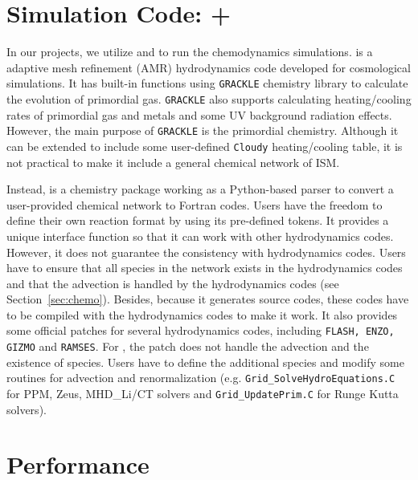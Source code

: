 \section{Simulation Code: \ENZO+\KROME}

In our projects, we utilize {\ENZO}\cite{Bryan2014} and {\KROME}\cite{Grassi2014a} to run the chemodynamics simulations. {\ENZO} is a adaptive mesh refinement (AMR) hydrodynamics code developed for cosmological simulations. It has built-in functions using {\tt GRACKLE} chemistry library to calculate the evolution of primordial gas. {\tt GRACKLE} also supports calculating heating/cooling rates of primordial gas and metals and some UV background radiation effects. However, the main purpose of {\tt GRACKLE} is the primordial chemistry. Although it can be extended to include some user-defined {\tt Cloudy} heating/cooling table, it is not practical to make it include a general chemical network of ISM. 

Instead, {\KROME} is a chemistry package working as a Python-based parser to convert a user-provided chemical network to Fortran codes. Users have the freedom to define their own reaction format by using its pre-defined tokens. It provides a unique interface function so that it can work with other hydrodynamics codes. However, it does not guarantee the consistency with hydrodynamics codes. Users have to ensure that all species in the network exists in the hydrodynamics codes and that the advection is handled by the hydrodynamics codes (see Section~\ref{sec:chemo}). Besides, because it generates source codes, these codes have to be compiled with the hydrodynamics codes to make it work. It also provides some official patches for several hydrodynamics codes, including {\tt FLASH, ENZO, GIZMO} and {\tt RAMSES}. For {\ENZO}, the patch does not handle the advection and the existence of species. Users have to define the additional species and modify some routines for advection and renormalization (e.g. {\tt Grid\_SolveHydroEquations.C} for PPM, Zeus, MHD\_Li/CT solvers and {\tt Grid\_UpdatePrim.C} for Runge Kutta solvers).

\section{Performance\label{sec:perform}}


